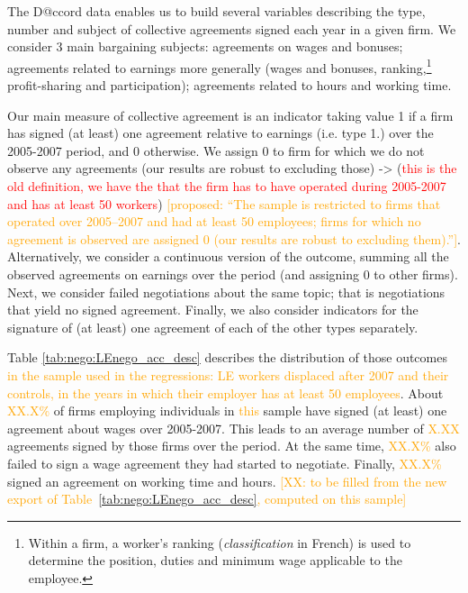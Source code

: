 The D@ccord data enables us to build several variables describing the type, number and subject of collective agreements signed each year in a given firm. We consider 3 main bargaining subjects: agreements on wages and bonuses; agreements related to earnings more generally (wages and bonuses, ranking,\footnote{Within a firm, a worker's ranking (\textit{classification} in French) is used to determine the position, duties and minimum wage applicable to the employee.} profit-sharing and participation); agreements related to hours and working time.

Our main measure of collective agreement is an indicator taking value 1 if a firm has signed (at least) one agreement relative to earnings (i.e. type 1.) over the 2005-2007 period, and 0 otherwise. We assign 0 to firm for which we do not observe any agreements (our results are robust to excluding those) -> (\textcolor{red}{this is the old definition, we have the that the firm has to have operated during 2005-2007 and has at least 50 workers}) \textcolor{orange}{[proposed: ``The sample is restricted to firms that operated over 2005--2007 and had at least 50 employees; firms for which no agreement is observed are assigned 0 (our results are robust to excluding them).'']}. Alternatively, we consider a continuous version of the outcome, summing all the observed agreements on earnings over the period (and assigning 0 to other firms). Next, we consider failed negotiations about the same topic; that is negotiations that yield no signed agreement. Finally, we also consider indicators for the signature of (at least) one agreement of each of the other types separately. 

Table \ref{tab:nego:LEnego_acc_desc} describes the distribution of those outcomes \textcolor{orange}{in the sample used in the regressions: LE workers displaced after 2007 and their controls, in the years in which their employer has at least 50 employees}. About \textcolor{orange}{XX.X\%} of firms employing individuals in \textcolor{orange}{this} sample have signed (at least) one agreement about wages over 2005-2007. This leads to an average number of \textcolor{orange}{X.XX} agreements signed by those firms over the period. At the same time, \textcolor{orange}{XX.X\%} also failed to sign a wage agreement they had started to negotiate. Finally, \textcolor{orange}{XX.X\%} signed an agreement on working time and hours. \textcolor{orange}{[XX: to be filled from the new export of Table~\ref{tab:nego:LEnego_acc_desc}, computed on this sample]}


